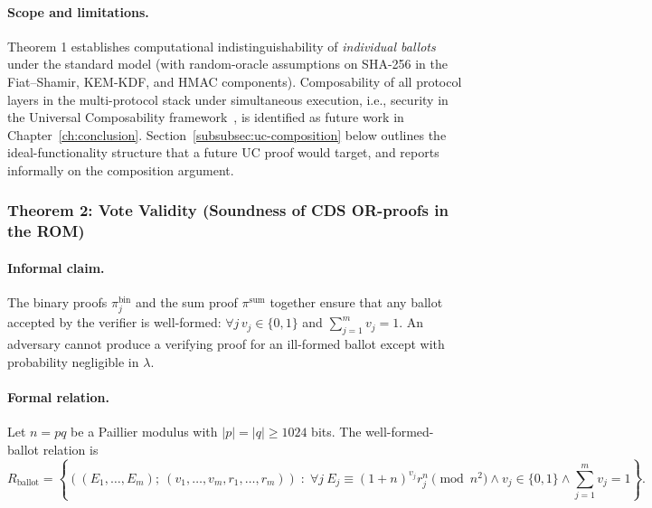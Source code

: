 \paragraph{Scope and limitations.} Theorem 1 establishes computational indistinguishability of \emph{individual ballots} under the standard model (with random-oracle assumptions on SHA-256 in the Fiat--Shamir, KEM-KDF, and HMAC components). Composability of all protocol layers in the multi-protocol stack under simultaneous execution, i.e., security in the Universal Composability framework~\cite{canetti2001uc}, is identified as future work in Chapter~\ref{ch:conclusion}. Section~\ref{subsubsec:uc-composition} below outlines the ideal-functionality structure that a future UC proof would target, and reports informally on the composition argument.

\subsubsection{Theorem 2: Vote Validity (Soundness of CDS OR-proofs in the ROM)}
\label{subsubsec:t2-vote-validity}

\paragraph{Informal claim.} The binary proofs $\pi_j^{\text{bin}}$ and the sum proof $\pi^{\text{sum}}$ together ensure that any ballot accepted by the verifier is well-formed: $\forall j\, v_j \in \{0,1\}$ and $\sum_{j=1}^m v_j = 1$. An adversary cannot produce a verifying proof for an ill-formed ballot except with probability negligible in $\lambda$.

\paragraph{Formal relation.} Let $n = pq$ be a Paillier modulus with $|p| = |q| \geq 1024$ bits. The well-formed-ballot relation is
\begin{equation}
    R_{\text{ballot}} = \left\{ \left( (E_1, \ldots, E_m);\ (v_1, \ldots, v_m, r_1, \ldots, r_m) \right) \;:\; \forall j\ E_j \equiv (1+n)^{v_j} r_j^{n} \!\!\!\pmod{n^2} \wedge v_j \in \{0,1\} \wedge \textstyle\sum_{j=1}^{m} v_j = 1 \right\}.
    \label{eq:r-ballot}
\end{equation}

